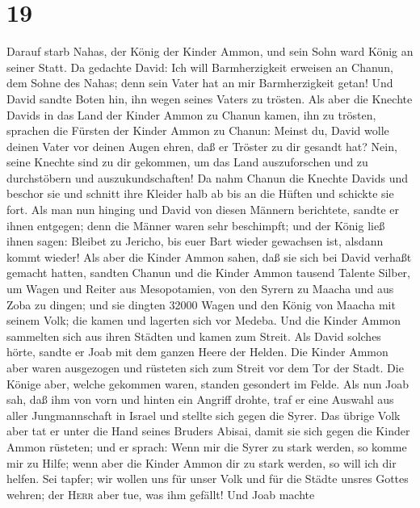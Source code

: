 \hypertarget{section-18}{%
\section{19}\label{section-18}}

 Darauf starb Nahas, der König der Kinder Ammon, und sein
Sohn ward König an seiner Statt.  Da gedachte David: Ich
will Barmherzigkeit erweisen an Chanun, dem Sohne des Nahas; denn sein
Vater hat an mir Barmherzigkeit getan! Und David sandte Boten hin, ihn
wegen seines Vaters zu trösten. Als aber die Knechte Davids in das Land
der Kinder Ammon zu Chanun kamen, ihn zu trösten, 
sprachen die Fürsten der Kinder Ammon zu Chanun: Meinst du, David wolle
deinen Vater vor deinen Augen ehren, daß er Tröster zu dir gesandt hat?
Nein, seine Knechte sind zu dir gekommen, um das Land auszuforschen und
zu durchstöbern und auszukundschaften!  Da nahm Chanun die
Knechte Davids und beschor sie und schnitt ihre Kleider halb ab bis an
die Hüften und schickte sie fort.  Als man nun hinging und
David von diesen Männern berichtete, sandte er ihnen entgegen; denn die
Männer waren sehr beschimpft; und der König ließ ihnen sagen: Bleibet zu
Jericho, bis euer Bart wieder gewachsen ist, alsdann kommt wieder!
 Als aber die Kinder Ammon sahen, daß sie sich bei David
verhaßt gemacht hatten, sandten Chanun und die Kinder Ammon tausend
Talente Silber, um Wagen und Reiter aus Mesopotamien, von den Syrern zu
Maacha und aus Zoba zu dingen;  und sie dingten 32000
Wagen und den König von Maacha mit seinem Volk; die kamen und lagerten
sich vor Medeba. Und die Kinder Ammon sammelten sich aus ihren Städten
und kamen zum Streit.  Als David solches hörte, sandte er
Joab mit dem ganzen Heere der Helden.  Die Kinder Ammon
aber waren ausgezogen und rüsteten sich zum Streit vor dem Tor der
Stadt. Die Könige aber, welche gekommen waren, standen gesondert im
Felde.  Als nun Joab sah, daß ihm von vorn und hinten ein
Angriff drohte, traf er eine Auswahl aus aller Jungmannschaft in Israel
und stellte sich gegen die Syrer.  Das übrige Volk aber
tat er unter die Hand seines Bruders Abisai, damit sie sich gegen die
Kinder Ammon rüsteten;  und er sprach: Wenn mir die Syrer
zu stark werden, so komme mir zu Hilfe; wenn aber die Kinder Ammon dir
zu stark werden, so will ich dir helfen.  Sei tapfer; wir
wollen uns für unser Volk und für die Städte unsres Gottes wehren; der
\textsc{Herr} aber tue, was ihm gefällt!  Und Joab machte
